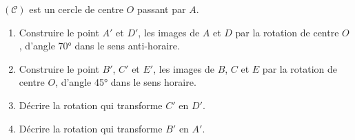 \begin{exercice*}
    $(\mathcal{C})$ est un cercle de centre $O$ passant par $A$.
    \begin{enumerate}
        \item Construire le point $A'$ et $D'$, les images de $A$ et $D$ par la rotation de centre $O$, d'angle \ang{70} dans le sens anti-horaire.
        \item Construire le point $B'$, $C'$ et $E'$, les images de $B$, $C$ et $E$ par la rotation de centre $O$, d'angle \ang{45} dans le sens horaire.
        \item Décrire la rotation qui transforme $C'$ en $D'$.
        \item Décrire la rotation qui transforme $B'$ en $A'$.
    \end{enumerate}
    \begin{center}
        \begin{Geometrie}[CoinHD={(7u,6u)}]
            \enonceTroisiemeGTroisExoDix
        \end{Geometrie}
    \end{center}
\end{exercice*}
